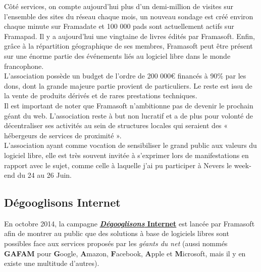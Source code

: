 \documentclass[10pt,a4paper, twoside]{report}
\begin{document}
	Côté services, on compte aujourd'hui plus d'un demi-million de visites sur l'ensemble des sites du réseau chaque mois, un nouveau sondage est créé environ chaque minute sur Framadate et 100 000 pads sont actuellement actifs sur Framapad. Il y a aujourd'hui une vingtaine de livres édités par Framasoft. Enfin, grâce à la répartition géographique de ses membres, Framasoft peut être présent sur une énorme partie des événements liés au logiciel libre dans le monde francophone.
	\\
	
	L'association possède un budget de l'ordre de 200 000\euro{} financés à 90\% par les dons, dont la grande majeure partie provient de particuliers. Le reste est issu de la vente de produits dérivés et de rares prestations techniques.
	\\
	
	Il est important de noter que Framasoft n'ambitionne pas de devenir le prochain géant du web. L'association reste à but non lucratif et a de plus pour volonté de décentraliser ses activités au sein de structures locales qui seraient des « hébergeurs de services de proximité ».
	\\
		
	L'association ayant comme vocation de sensibiliser le grand public aux valeurs du logiciel libre, elle est très souvent invitée à s'exprimer lors de manifestations en rapport avec le sujet, comme celle à laquelle j'ai pu participer à Nevers le week-end du 24 au 26 Juin.
	
	\subsection{Dégooglisons Internet}
	\label{subsec:degoogl}
	
	En octobre 2014, la campagne \href{https://degooglisons-internet.org/}{\textbf{\textit{Dégooglisons} Internet}} est lancée par Framasoft afin de montrer au public que des solutions à base de logiciels libres sont possibles face aux services proposés par les \textit{géants du net} (aussi nommés \textbf{GAFAM} pour \textbf{G}oogle, \textbf{A}mazon, \textbf{F}acebook, \textbf{A}pple et \textbf{M}icrosoft, mais il y en existe une multitude d'autres).
	
\end{document}
